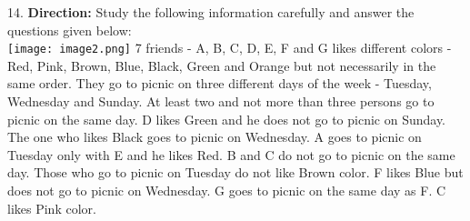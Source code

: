 \documentclass[
]{article}
\begin{document}
14. \textbf{Direction:} Study the following information carefully and answer the questions given below:\\
\texttt{[image: image2.png]}
7 friends - A, B, C, D, E, F and G likes different colors - Red, Pink, Brown, Blue, Black, Green
and Orange but not necessarily in the same order. They go to picnic on three different days
of the week - Tuesday, Wednesday and Sunday. At least two and not more than three
persons go to picnic on the same day.
D likes Green and he does not go to picnic on Sunday. The one who likes Black goes to
picnic on Wednesday. A goes to picnic on Tuesday only with E and he likes Red. B and C do
not go to picnic on the same day. Those who go to picnic on Tuesday do not like Brown
color. F likes Blue but does not go to picnic on Wednesday. G goes to picnic on the same day
as F. C likes Pink color.\\
\end{document}
